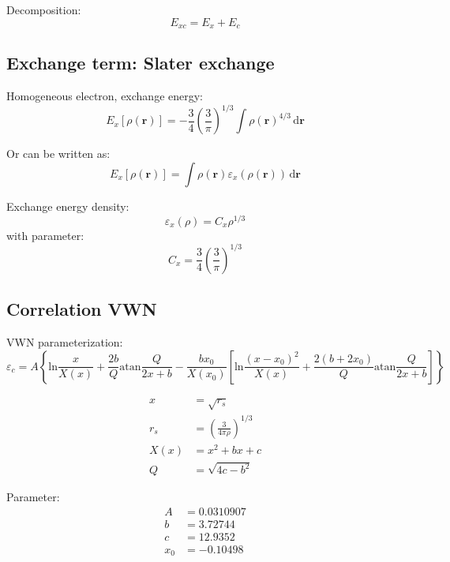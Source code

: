 Decomposition:
\begin{equation}
E_{xc} = E_{x} + E_{c}
\end{equation}

\subsection{Exchange term: Slater exchange}

Homogeneous electron, exchange energy:
\begin{equation}
E_{x}[\rho(\mathbf{r})] = -\frac{3}{4} \left(\frac{3}{\pi}\right)^{1/3}
\int \rho(\mathbf{r})^{4/3}\,\mathrm{d}\mathbf{r}
\end{equation}

Or can be written as:
\begin{equation}
E_{x}[\rho(\mathbf{r})] = \int \rho(\mathbf{r}) \varepsilon_{x}(\rho(\mathbf{r}))\,\mathrm{d}\mathbf{r}
\end{equation}

Exchange energy density:
\begin{equation}
\varepsilon_{x}(\rho) = C_{x}\rho^{1/3}
\end{equation}
with parameter:
\begin{equation}
C_{x} = \frac{3}{4}\left(\frac{3}{\pi}\right)^{1/3}  
\end{equation}


\subsection{Correlation VWN}

VWN parameterization:
\begin{equation}
\varepsilon_{c} = A \left\{
\mathrm{ln}\frac{x}{X(x)} + \frac{2b}{Q}\mathrm{atan}\frac{Q}{2x+b}
- \frac{bx_{0}}{X(x_{0})}\left[
\mathrm{ln}\frac{(x - x_0)^2}{X(x)} + \frac{2(b + 2x_0)}{Q}\mathrm{atan}\frac{Q}{2x + b}
\right]
\right\}
\end{equation}


\begin{align}
x & = \sqrt{r_{s}} \\
r_s & = \left( \frac{3}{4\pi\rho} \right)^{1/3} \\
X(x) & = x^2 + bx + c \\
Q & = \sqrt{4c - b^2}
\end{align}

Parameter:
\begin{align}
A & = 0.0310907 \\
b & = 3.72744 \\
c & = 12.9352 \\
x_0 & = -0.10498
\end{align}

